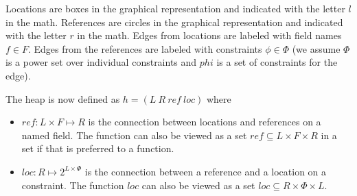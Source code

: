 Locations are boxes in the graphical representation and indicated with
the letter $l$ in the math. References are circles in the graphical
representation and indicated with the letter $r$ in the math. Edges
from locations are labeled with field names $f \in F$. Edges from the
references are labeled with constraints $\phi \in \Phi$ (we assume
$\Phi$ is a power set over individual constraints and $phi$ is a set
of constraints for the edge).

The heap is now defined
as $h = (L\ R\ \mathit{ref}\ \mathit{loc})$ where
\begin{itemize}
\item $\mathit{ref} : L \times F \mapsto R$ is the
  connection between locations and references on a named field. The
  function can also be viewed as a set $\mathit{ref} \subseteq L
  \times F \times R$ in a set if that is preferred to a function.
\item $\mathit{loc} : R \mapsto 2^{L \times \Phi}$ is the connection
  between a reference and a location on a constraint. The function
  $\mathit{loc}$ can also be viewed as a set $\mathit{loc} \subseteq R
  \times \Phi \times L$.
\end{itemize}





\begin{comment}
\begin{algorithm}
 \SetAlgoLined
 \KwData{this text}
 \KwResult{how to write algorithm with \LaTeX2e }
 initialization\;
 \While{not at end of this document $\wedge x < 2$}{
  read current\;
  \eIf{understand}{
   go to next section\;
   current section becomes this one\;
   }{
   go back to the beginning of current section\;
  }
 }
 \caption{How to write algorithms}
\end{algorithm}
\end{comment}
